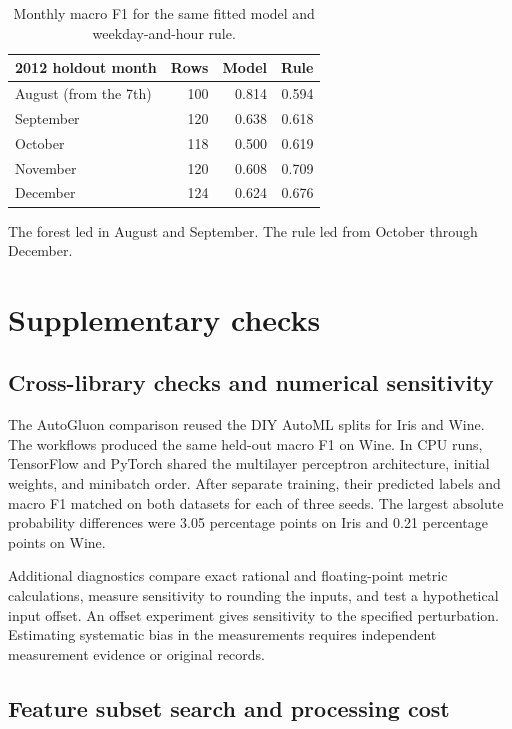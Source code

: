 \documentclass[10pt,a4paper]{article}
\begin{document}
\begin{table}[H]
\centering
\caption{Monthly macro F1 for the same fitted model and weekday-and-hour rule.}
\small
\begin{tabular}{lrrr}
\toprule
2012 holdout month & Rows & Model & Rule \\
\midrule
August (from the 7th) & 100 & 0.814 & 0.594 \\
September & 120 & 0.638 & 0.618 \\
October & 118 & 0.500 & 0.619 \\
November & 120 & 0.608 & 0.709 \\
December & 124 & 0.624 & 0.676 \\
\bottomrule
\end{tabular}
\end{table}

The forest led in August and September. The rule led from October through December.

\clearpage
\section{Supplementary checks}

\subsection{Cross-library checks and numerical sensitivity}

The AutoGluon comparison reused the DIY AutoML splits for Iris and Wine. The workflows produced the same held-out macro F1 on Wine. In CPU runs, TensorFlow and PyTorch shared the multilayer perceptron architecture, initial weights, and minibatch order. After separate training, their predicted labels and macro F1 matched on both datasets for each of three seeds. The largest absolute probability differences were 3.05 percentage points on Iris and 0.21 percentage points on Wine. \cite{crosschecks}

Additional diagnostics compare exact rational and floating-point metric calculations, measure sensitivity to rounding the inputs, and test a hypothetical input offset. An offset experiment gives sensitivity to the specified perturbation. Estimating systematic bias in the measurements requires independent measurement evidence or original records. \cite{crosschecks}

\subsection{Feature subset search and processing cost}
\end{document}
